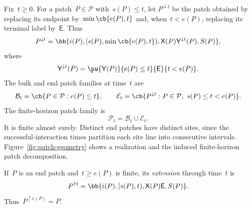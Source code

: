 Fix~$t\geq0$. For a patch~$P\in\mathcal P$ with~$s(P)\leq t$, let
$P^{\downarrow t}$ be the patch obtained by replacing its endpoint
by~$\min\cb{e(P),t}$ and, when~$t<e(P)$, replacing its terminal label
by~$\mathsf E$. Thus
\begin{equation*}
P^{\downarrow t}
=
\bb{
 i(P),
 [s(P),\min\cb{e(P),t}),
 \mathsf X(P)\mathsf Y^{\downarrow t}(P),
 S(P)
},
\end{equation*}
where
\begin{equation*}
\mathsf Y^{\downarrow t}(P)
=
\pw{\mathsf Y(P)}{e(P)\leq t}{\mathsf E}{t<e(P)}.
\end{equation*}
The bulk and end patch families at time~$t$ are
\begin{equation*}
\mathcal B_t=\cb{P\in\mathcal P:e(P)\leq t},
\qquad
\mathcal E_t=
\cb{P^{\downarrow t}:P\in\mathcal P,\ s(P)\leq t<e(P)}.
\end{equation*}
The finite-horizon patch family is
\begin{equation*}
\mathcal P_t=\mathcal B_t\cup\mathcal E_t.
\end{equation*}
It is finite almost surely. Distinct end patches have distinct sites, since the
successful-interaction times partition each site line into consecutive
intervals. 
Figure~\ref{fig:patch-geometry} shows a realization and the induced
finite-horizon patch decomposition.

If~$P$ is an end patch and~$t\geq e(P)$ is finite, its \emph{extension} through
time~$t$ is
\begin{equation}
\label{eq:geometric-patch-extension}
P^{\uparrow t}
=
\bb{i(P),[s(P),t),\mathsf X(P)\mathsf E,S(P)}.
\end{equation}
Thus~$P^{\uparrow e(P)}=P$.
